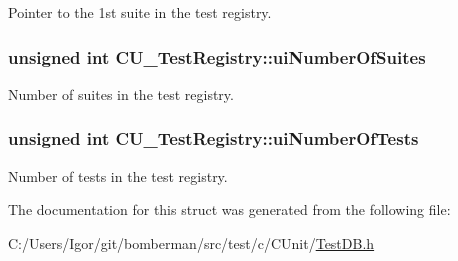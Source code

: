 Pointer to the 1st suite in the test registry. 

\hypertarget{struct_c_u___test_registry_aed4b67b99d6e0c875bcf08e924a82d68}{
\subsubsection[{ui\+Number\+Of\+Suites}]{\setlength{\rightskip}{0pt plus 5cm}unsigned int C\+U\+\_\+\+Test\+Registry\+::ui\+Number\+Of\+Suites}}\label{struct_c_u___test_registry_aed4b67b99d6e0c875bcf08e924a82d68}


Number of suites in the test registry. 

\hypertarget{struct_c_u___test_registry_a2ecdcc62de28e626fd55d8dc903df06c}{
\subsubsection[{ui\+Number\+Of\+Tests}]{\setlength{\rightskip}{0pt plus 5cm}unsigned int C\+U\+\_\+\+Test\+Registry\+::ui\+Number\+Of\+Tests}}\label{struct_c_u___test_registry_a2ecdcc62de28e626fd55d8dc903df06c}


Number of tests in the test registry. 



The documentation for this struct was generated from the following file\+:\begin{DoxyCompactItemize}
\item 
C\+:/\+Users/\+Igor/git/bomberman/src/test/c/\+C\+Unit/\hyperlink{_test_d_b_8h}{Test\+D\+B.\+h}\end{DoxyCompactItemize}
